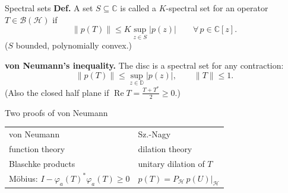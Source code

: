 \documentclass[14pt]{beamer}
\newcommand{\C}{\mathbb{C}}
\newcommand{\D}{\mathbb{D}}
\newcommand{\Hil}{\mathcal{H}}
\newcommand{\B}{\mathcal{B}}
\newcommand{\norm}[1]{\lVert #1\rVert}
\DeclareMathOperator{\re}{Re}
\begin{document}
\begin{frame}{Spectral sets}
  \textbf{Def.} A set $S\subseteq\C$ is called a $K$-spectral set for an operator $T\in\B(\Hil)$ if
  \[
    \norm{p(T)}\le K\sup_{z\in S}|p(z)|\qquad\forall\,p\in\C[z].
  \]
  ($S$ bounded, polynomially convex.)

  \medskip
  \textbf{von Neumann's inequality.} The disc is a spectral set for any contraction:
  \[
    \norm{p(T)}\le\sup_{z\in\D}|p(z)|,\qquad \norm{T}\le1.
  \]
  (Also the closed half plane if $\re T=\tfrac{T+T^*}{2}\ge0$.)
\end{frame}

\begin{frame}{Two proofs of von Neumann}
  \vfill
  \begin{center}
  \setlength{\tabcolsep}{4pt}
  \begin{tabular}{@{}l|l@{}}
    von Neumann & Sz.-Nagy\\[8pt]
    function theory & dilation theory\\[8pt]
    Blaschke products & unitary dilation of $T$\\[8pt]
    M\"obius: $I-\varphi_a(T)^*\varphi_a(T)\ge0$ & $p(T)=P_\Hil\,p(U)|_\Hil$
  \end{tabular}
  \end{center}
  \vfill
\end{frame}
\end{document}
